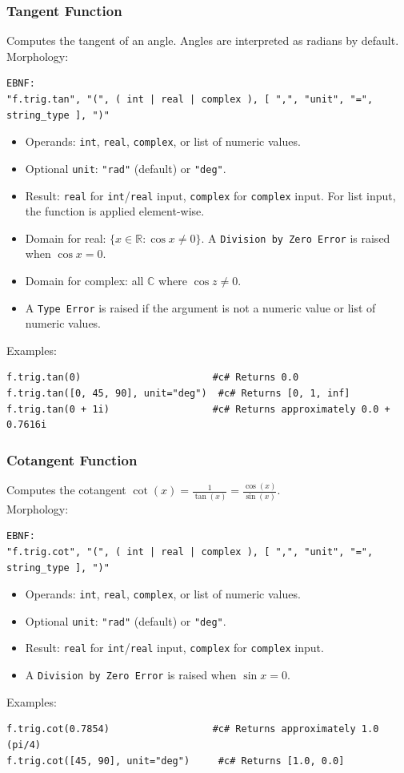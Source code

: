 \subsubsection{Tangent Function}
Computes the tangent of an angle. Angles are interpreted as radians by default. \\
Morphology:
\begin{verbatim}
EBNF:
"f.trig.tan", "(", ( int | real | complex ), [ ",", "unit", "=", string_type ], ")"
\end{verbatim}
\begin{itemize}
\item Operands: \texttt{int}, \texttt{real}, \texttt{complex}, or list of numeric values.
\item Optional \texttt{unit}: \texttt{"rad"} (default) or \texttt{"deg"}.
\item Result: \texttt{real} for \texttt{int}/\texttt{real} input, \texttt{complex} for \texttt{complex} input. For list input, the function is applied element-wise.
\item Domain for real: $\{x \in \mathbb{R} : \cos x \neq 0\}$. A \texttt{Division by Zero Error} is raised when $\cos x = 0$.
\item Domain for complex: all $\mathbb{C}$ where $\cos z \neq 0$.
\item A \texttt{Type Error} is raised if the argument is not a numeric value or list of numeric values.
\end{itemize}
Examples:
\begin{verbatim}
f.trig.tan(0)                       #c# Returns 0.0
f.trig.tan([0, 45, 90], unit="deg")  #c# Returns [0, 1, inf]
f.trig.tan(0 + 1i)                  #c# Returns approximately 0.0 + 0.7616i
\end{verbatim}

\subsubsection{Cotangent Function}
Computes the cotangent $\cot(x) = \frac{1}{\tan(x)} = \frac{\cos(x)}{\sin(x)}$. \\
Morphology:
\begin{verbatim}
EBNF:
"f.trig.cot", "(", ( int | real | complex ), [ ",", "unit", "=", string_type ], ")"
\end{verbatim}
\begin{itemize}
\item Operands: \texttt{int}, \texttt{real}, \texttt{complex}, or list of numeric values.
\item Optional \texttt{unit}: \texttt{"rad"} (default) or \texttt{"deg"}.
\item Result: \texttt{real} for \texttt{int}/\texttt{real} input, \texttt{complex} for \texttt{complex} input.
\item A \texttt{Division by Zero Error} is raised when $\sin x = 0$.
\end{itemize}
Examples:
\begin{verbatim}
f.trig.cot(0.7854)                  #c# Returns approximately 1.0  (pi/4)
f.trig.cot([45, 90], unit="deg")     #c# Returns [1.0, 0.0]
\end{verbatim}

